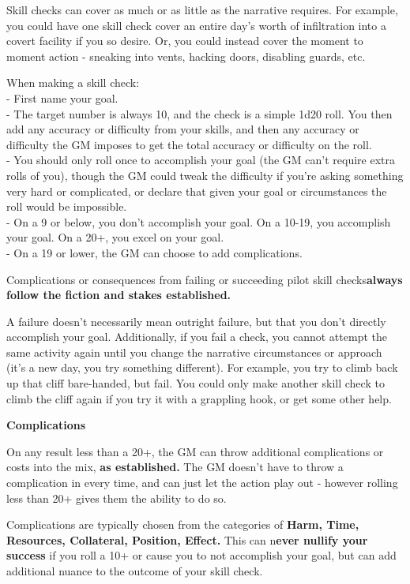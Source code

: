 Skill checks can cover as much or as little as the narrative requires. For example, you could have one skill check cover an entire day’s worth of infiltration into a covert facility if you so desire. Or, you could instead cover the moment to moment action - sneaking into vents, hacking doors, disabling guards, etc.

When making a skill check:\\
-    First name your goal.\\ 
-    The target number is always 10, and the check is a simple 1d20 roll. You then add any accuracy or difficulty from your skills, and then any accuracy or difficulty the GM imposes to get the total accuracy or difficulty on the roll.\\ 
-    You should only roll once to accomplish your goal (the GM can’t require extra rolls of you), though the GM could tweak the difficulty if you’re asking something very hard or complicated, or declare that given your goal or circumstances the roll would be impossible.\\ 
-    On a 9 or below, you don’t accomplish your goal. On a 10-19, you accomplish your goal. On a 20+, you excel on your goal.\\ 
-    On a 19 or lower, the GM can choose to add complications. 

Complications or consequences from failing or succeeding pilot skill checks\textbf{always follow the fiction and stakes established.} 


A failure doesn’t necessarily mean outright failure, but that you don’t directly accomplish your goal. Additionally, if you fail a check, you cannot attempt the same activity again until you change the narrative circumstances or approach (it’s a new day, you try something different). For example, you try to climb back up that cliff bare-handed, but fail. You could only make another skill check to climb the cliff again if you try it with a grappling hook, or get some other help.

                                                \textbf{Complications} 

On any result less than a 20+, the GM can throw additional complications or costs into the mix, \textbf{as established.} The GM doesn’t have to throw a complication in every time, and can just let the action play out - however rolling less than 20+ gives them the ability to do so. 

Complications are typically chosen from the categories of \textbf{Harm, Time, Resources, Collateral, Position, Effect.} This can n\textbf{ever nullify your success} if you roll a 10+ or cause you to not accomplish your goal, but can add additional nuance to the outcome of your skill check.


